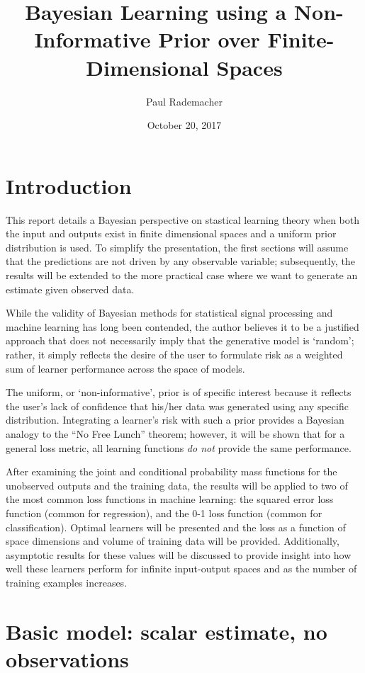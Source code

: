 \documentclass[11pt]{article}
\title{Bayesian Learning using a Non-Informative Prior over Finite-Dimensional Spaces}
\author{Paul Rademacher}
\date{October 20, 2017}
\begin{document}
\maketitle


\section{Introduction}

This report details a Bayesian perspective on stastical learning theory when both the input and outputs exist in finite dimensional spaces and a uniform prior distribution is used. To simplify the presentation, the first sections will assume that the predictions are not driven by any observable variable; subsequently, the results will be extended to the more practical case where we want to generate an estimate given observed data.

While the validity of Bayesian methods for statistical signal processing and machine learning has long been contended, the author believes it to be a justified approach that does not necessarily imply that the generative model is `random'; rather, it simply reflects the desire of the user to formulate risk as a weighted sum of learner performance across the space of models. 

The uniform, or `non-informative', prior is of specific interest because it reflects the user's lack of confidence that his/her data was generated using any specific distribution. Integrating a learner's risk with such a prior provides a Bayesian analogy to the ``No Free Lunch'' theorem; however, it will be shown that for a general loss metric, all learning functions \emph{do not} provide the same performance.

After examining the joint and conditional probability mass functions for the unobserved outputs and the training data, the results will be applied to two of the most common loss functions in machine learning: the squared error loss function (common for regression), and the 0-1 loss function (common for classification). Optimal learners will be presented and the loss as a function of space dimensions and volume of training data will be provided. Additionally, asymptotic results for these values will be discussed to provide insight into how well these learners perform for infinite input-output spaces and as the number of training examples increases. 



\section{Basic model: scalar estimate, no observations}
\end{document}
